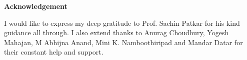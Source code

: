 \begin{Acknowledgement}
    \noindent
    \begin{center}
        {\Large \textbf{Acknowledgement}}\\
    \end{center}
    I would like to express my deep gratitude to Prof. Sachin Patkar for his kind guidance all through. I also extend thanks to Anurag Choudhury, Yogesh Mahajan, M Abhijna Anand, Mini K. Namboothiripad and Mandar Datar  for their constant help and support.
    \begin{flushright}
    \end{flushright}

\end{Acknowledgement}